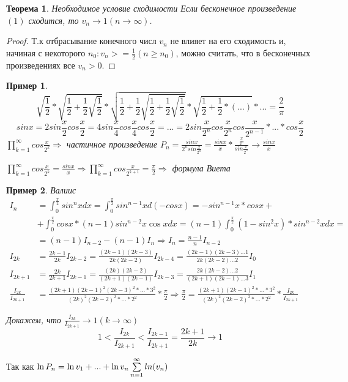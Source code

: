 \documentclass[12pt, oneside]{article}
\theoremstyle{plain}
\newtheorem{Theorem}{Теорема}
\newtheorem{Example}{Пример}
\begin{document}
	\begin{Theorem}
		{Необходимое условие сходимости} Если бесконечное произведение $(1)$ сходится,
		то ${v_n}\to 1 (n \to \infty)$.
	\end{Theorem}
	\begin{proof}
		Т.к отбрасывание конечного числ $v_{n}$ не влияет на его сходимость и,
		начиная с некоторого $n_{0}: v_{n} >= \frac{1}{2}(n \geq n_{0})$, можно считать,
		что в бесконечных произведениях все $v_{n} > 0$.
	\end{proof}
	\begin{Example}
		\[
			\sqrt{\frac{1}{2}}*\sqrt{\frac{1}{2} + \frac{1}{2} \sqrt{\frac{1}{2}}}* \sqrt{\frac{1}{2}
			+ \frac{1}{2}\sqrt{\frac{1}{2} + \frac{1}{2}\sqrt{\frac{1}{2}}}}* \sqrt{\frac{1}{2}
			+ \frac{1}{2} * (...)}* ... = \frac{2}{\pi}
		\]
		\[
			sinx = 2sin\frac{x}{2}cos\frac{x}{2}= 4 sin\frac{x}{4}cos\frac{x}{4}cos\frac{x}{2}
			= ... = 2sin\frac{x}{2^{n}}cos\frac{x}{2^{n}}cos\frac{x}{2^{n-1}}*...*cos\frac{x}{2}
		\]
		$\prod\limits_{k = 1}^{\infty}cos\frac{x}{2^{k}}\Rightarrow$ частичное произведение
		$P_{n} = \frac{sinx}{2^{n}sin\frac{x}{2^n}}= \frac{sinx}{x}* \frac{\frac{x}{2^{n}}}{sin\frac{x}{2^n}}
		\to \frac{sinx}{x}$

		$\prod\limits_{k = 1}^{\infty}cos\frac{x}{2^{k}}= \frac{sinx}{x}\Rightarrow \prod
		\limits_{k = 1}^{\infty}cos\frac{x}{2^{k+1}}= \frac{\pi}{2}\Rightarrow$
		формула Виета
	\end{Example}
	\begin{Example}
		Валиис
		\begin{equation}
		\begin{split}
			I_{n} 
			&= \int_{0}^{\frac{\pi}{2}}sin^{n}xdx = 
			  \int_{0}^{\frac{\pi}{2}}sin^{n-1}x d(-cosx) = -sin^{n-1}{x}*cosx +\\ 
			&+ \int_{0}^{\frac{\pi}{2}}cosx * (n-1)sin^{n-2}x\cos{x}dx =
			  (n - 1) \int_{0}^{\frac{\pi}{2}}(1-sin^{2}x)*sin^{n-2}xdx =\\
			&= (n - 1)I_{n-2}-(n -1)I_{n} \Rightarrow I_{n} = \frac{n - 1}{n}I_{n-2}\\
		  I_{2k} 
      &= \frac{2k-1}{2k}I_{2k-2}=\frac{(2k-1)(2k-3)}{2k(2k-2)}I_{2k-4} = 
			  \frac{(2k- 1)(2k - 3)...1}{2k(2k-2)...2}I_{0} \\
			I_{2k + 1}
		  &= \frac{2k}{2k+1}I_{2k-1}=\frac{(2k)(2k-2)}{(2k+1)(2k-1)}I_{2k-3} = \frac{2k(2k - 2)...2}{(2k+1)(2k-1)...3}I_{1} \\
			\frac{I_{2k}}{I_{2k + 1}}
			&= \frac{(2k + 1)(2k - 1)^{2}(2k - 3)^{2}*...*3^{2}}{(2k)^{2}(2k-2)^{2}*...*2^{2}} * 
			  \frac{\pi}{2}\Rightarrow \frac{\pi}{2} = \frac{(2k + 1)(2k - 1)^{2}*...*3^{2}}{(2k)^{2}(2k-2)^{2}*...*2^{2}} * \frac{I_{2k}}{I_{2k + 1}}\nonumber
		\end{split}
		\end{equation}

		Докажем, что $\frac{I_{2k}}{I_{2k+1}}\to 1 (k \to \infty)$
		\[
			1 < \frac{I_{2k}}{I_{2k+1}}< \frac{I_{2k-1}}{I_{2k + 1}}= \frac{2k + 1}{2k}
			\to 1
		\]
	\end{Example}
	Так как $\ln{P_n}= \ln{v_1}+ ... + \ln{v_n}\\
	\sum\limits_{n = 1}^{\infty}ln(v_{n})$
\end{document}
